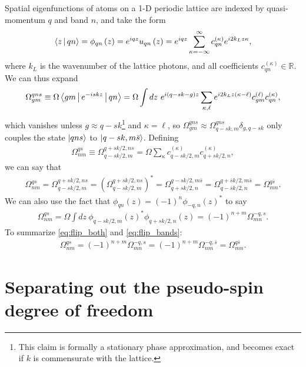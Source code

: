 \documentclass[aps,notitlepage,nofootinbib,11pt]{revtex4-1}
\newcommand{\p}[1]{\left(#1\right)} %
\newcommand{\bk}{\Braket} %
\newcommand{\1}{\mathds{1}}
\begin{document}
Spatial eigenfunctions of atoms on a 1-D periodic lattice are indexed
by quasi-momentum $q$ and band $n$, and take the form
\begin{align}
  \bk{z|qn}
  = \phi_{qn}\p{z}
  = e^{iqz} u_{qn}\p{z}
  = e^{iqz} \sum_{\kappa=-\infty}^\infty c_{qn}^{(\kappa)} e^{i2k_L z\kappa},
\end{align}
where $k_L$ is the wavenumber of the lattice photons, and all
coefficients $c_{qn}^{(\kappa)}\in\mathbb R$.  We can thus expand
\begin{align}
  \Omega^{qns}_{gm}
  \equiv \Omega\bk{gm|e^{-iskz}|qn}
  = \Omega \int dz~ e^{i\p{q-sk-g}z}
  \sum_{\kappa,\ell} e^{i2k_Lz\p{\kappa-\ell}}
  c_{gm}^{(\ell)} c_{qn}^{(\kappa)},
\end{align}
which vanishes unless $g\approx q-sk$\footnote{This claim is formally
  a stationary phase approximation, and becomes exact if $k$ is
  commensurate with the lattice.} and $\kappa=\ell$, so
$\Omega^{qns}_{gm}\approx\Omega^{qns}_{q-sk,m}\delta_{g,q-sk}$ only
couples the state $\ket{qns}$ to $\ket{q-sk,m\bar s}$.  Defining
\begin{align}
  \Omega^{qs}_{nm}
  \equiv \Omega^{q+sk/2,ns}_{q-sk/2,m}
  = \Omega \sum_\kappa c_{q-sk/2,m}^{(\kappa)} c_{q+sk/2,n}^{(\kappa)},
\end{align}
we can say that
\begin{align}
  \Omega^{qs}_{nm}
  = \Omega^{q+sk/2,ns}_{q-sk/2,m}
  = \p{\Omega^{q+sk/2,ns}_{q-sk/2,m}}^*
  = \Omega^{q-sk/2,m\bar s}_{q+sk/2,n}
  = \Omega^{q+\bar sk/2,m\bar s}_{q-\bar sk/2,n}
  = \Omega^{q\bar s}_{mn}.
  \label{eq:flip_both}
\end{align}
We can also use the fact that
$\phi_{qn}\p{z}=\p{-1}^n\phi_{-q,n}\p{z}^*$ to say
\begin{align}
  \Omega^{qs}_{nm}
  = \Omega\int dz~ \phi_{q-sk/2,m}\p{z}^* \phi_{q+sk/2,n}\p{z}
  = \p{-1}^{n+m}\Omega^{-q,s}_{mn}.
  \label{eq:flip_bands}
\end{align}
To summarize \eqref{eq:flip_both} and \eqref{eq:flip_bands}:
\begin{align}
  \Omega^{qs}_{nm}
  = \p{-1}^{n+m} \Omega^{-q,s}_{mn}
  = \p{-1}^{n+m} \Omega^{-q,\bar s}_{nm}
  = \Omega^{q\bar s}_{mn}.
  \label{eq:symmetries}
\end{align}


\section{Separating out the pseudo-spin degree of freedom}
\label{sec:spin_separation}
\end{document}
